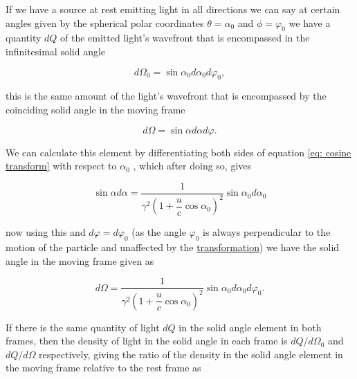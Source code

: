 \begin{derivation}

	If we have a source at rest emitting light in all directions we can say at certain angles given by the spherical polar coordinates $\theta = \alpha_0$ and $\phi= \varphi_0$ we have a quantity $dQ$ of the emitted light's wavefront that is encompassed in the infinitesimal solid angle

	\begin{equation}
		d\Omega_0 = \sin{\alpha_0} d\alpha_0 d\varphi_0,
	\end{equation}

	this is the same amount of the light's wavefront that is encompassed by the coinciding solid angle in the moving frame

	\begin{equation}
		d\Omega = \sin{\alpha} d\alpha d\varphi.
	\end{equation}

	We can calculate this element by differentiating both sides of equation
	\eqref{eq: cosine transform} with respect to $\alpha_0$ \cite{hogg1997special}, which after doing so, gives

	\begin{equation}
		\sin{\alpha} d\alpha = \dfrac{1}{{\gamma}^2\left(1 + \dfrac{u}{c}\cos{\alpha_0}\right)^2} \sin{\alpha_0} d\alpha_0
	\end{equation}

	now using this and ${d\varphi} = {d\varphi_0}$ (as the angle ${\varphi_0}$ is always perpendicular to the motion of the particle and unaffected by the \hyperlink{def-transform}{transformation}) we have the solid angle in the moving frame given as

	\begin{equation}
		d\Omega = \dfrac{1}{{\gamma}^2\left(1 + \dfrac{u}{c}\cos{\alpha_0}\right)^2} \sin{\alpha_0} d\alpha_0 d\varphi_0.
	\end{equation}


	If there is the same quantity of light $dQ$ in the solid angle element in both frames, then the density of light in the solid angle in each frame is $dQ/d\Omega_0$ and $dQ/d\Omega$ respectively, giving the ratio of the density in the solid angle element in the moving frame relative to the rest frame as


\end{derivation}
